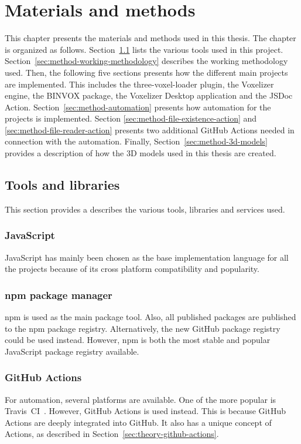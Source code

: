 \chapter[Method]{Materials and methods}
This chapter presents the materials and methods used in this thesis. The chapter is organized as follows. Section~\ref{sec:method-tools-and-libraries} lists the various tools used in this project. Section~\ref{sec:method-working-methodology} describes the working methodology used. Then, the following five sections presents how the different main projects are implemented. This includes the three-voxel-loader plugin, the Voxelizer engine, the BINVOX package, the Voxelizer Desktop application and the JSDoc Action. Section~\ref{sec:method-automation} presents how automation for the projects is implemented. Section \ref{sec:method-file-existence-action} and \ref{sec:method-file-reader-action} presents two additional GitHub Actions needed in connection with the automation. Finally, Section~\ref{sec:method-3d-models} provides a description of how the 3D models used in this thesis are created.


\section{Tools and libraries}
\label{sec:method-tools-and-libraries}
This section provides a describes the various tools, libraries and services used.

\subsection{JavaScript}
JavaScript has mainly been chosen as the base implementation language for all the projects because of its cross platform compatibility and popularity.

\subsection{npm package manager}
npm is used as the main package tool. Also, all published packages are published to the npm package registry. Alternatively, the new GitHub package registry could be used instead. However, npm is both the most stable and popular JavaScript package registry available.

\subsection{GitHub Actions}
For automation, several platforms are available. One of the more popular is Travis~CI~\cite{travis-ci}. However, GitHub Actions is used instead. This is because GitHub Actions are deeply integrated into GitHub. It also has a unique concept of Actions, as described in Section~\ref{sec:theory-github-actions}.

